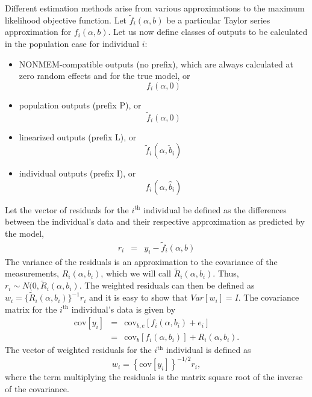 \documentclass{article}
\begin{document}
Different estimation methods arise from various approximations to
the maximum likelihood objective function. Let $\tilde{f}_{i}(\alpha, b)$
be a particular Taylor series approximation for $f_{i}(\alpha, b)$.
Let us now define classes of outputs to be calculated in the population case
for individual $i$:
\begin{itemize}
  \item NONMEM-compatible outputs (no prefix), which are always calculated at zero random effects and for the true model, or
	\begin{equation}
	\label{noprefix}
	f_i(\alpha, 0)
	\end{equation}
  \item population outputs (prefix P), or 
	\begin{equation}\label{P}\tilde{f}_i(\alpha, 0)\end{equation}
  \item linearized outputs (prefix L), or 
	\begin{equation}\label{L}\tilde{f}_i(\alpha, \check{b}_i)\end{equation}
  \item individual outputs (prefix I), or 
	\begin{equation}\label{I}f_i(\alpha, \hat{b}_i)\end{equation}
\end{itemize}

Let the vector of residuals for the $i^{\mbox{th}}$ individual be
defined as the differences between the individual's data and their 
respective approximation as predicted by the model,
  \begin{eqnarray}
    r_i & = & y_i - \tilde{f}_i(\alpha, b)
  \end{eqnarray}
The variance of the residuals is an approximation to the covariance 
of the measurements, $R_i(\alpha, b_i)$, which we will call 
$\tilde{R}_i(\alpha, b_i)$.
Thus, $r_i \sim N(0, \tilde{R}_i(\alpha, b_i)$. The weighted residuals
can then be defined as $w_i = \{\tilde{R}_i(\alpha, b_i)\}^{-1} r_i$
and it is easy to show that $Var[w_i] = I$.
The covariance matrix for the $i^{\mbox{th}}$ individual's data is
given by
  \begin{eqnarray}
    \mbox{cov}[y_i] & = & \mbox{cov}_{b,e}
          \left[ f_i(\alpha, b_i) + e_i \right] \nonumber \\
        & = & \mbox{cov}_{b} \left[ f_i(\alpha, b_i) \right]
                  + R_i(\alpha, b_i) .
  \end{eqnarray}
The vector of weighted residuals for the $i^{\mbox{th}}$ individual is
defined as 
  \begin{equation}
    w_i = \left\{ \mbox{cov}[y_i] \right\}^{-1/2} r_i,
  \end{equation}
where the term multiplying the residuals is the matrix square 
root of the inverse of the covariance.
\end{document}
